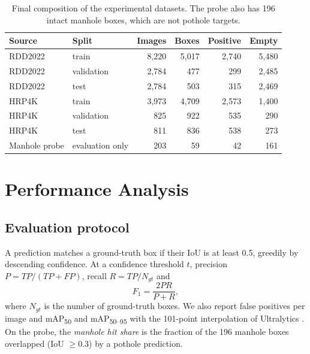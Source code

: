 \begin{table}[!htbp]
\centering
\small
\renewcommand{\arraystretch}{1.2}
\begin{tabular}{|L{2.8cm}|L{2.6cm}|r|r|r|r|}
\hline
\textbf{Source} & \textbf{Split} & \textbf{Images} & \textbf{Boxes} & \textbf{Positive} & \textbf{Empty} \\
\hline
RDD2022 & train & 8,220 & 5,017 & 2,740 & 5,480 \\
\hline
RDD2022 & validation & 2,784 & 477 & 299 & 2,485 \\
\hline
RDD2022 & test & 2,784 & 503 & 315 & 2,469 \\
\hline
HRP4K & train & 3,973 & 4,709 & 2,573 & 1,400 \\
\hline
HRP4K & validation & 825 & 922 & 535 & 290 \\
\hline
HRP4K & test & 811 & 836 & 538 & 273 \\
\hline
Manhole probe & evaluation only & 203 & 59 & 42 & 161 \\
\hline
\end{tabular}
\caption{Final composition of the experimental datasets. The probe also has 196 intact manhole boxes, which are not pothole targets.}
\label{tab:ch6-composition}
\end{table}

\section{Performance Analysis}

\subsection{Evaluation protocol}\label{sec:ch6-protocol}
A prediction matches a ground-truth box if their IoU is at least 0.5, greedily by descending confidence. At a confidence threshold $t$, precision $P=TP/(TP+FP)$, recall $R=TP/N_{gt}$ and
\begin{equation}
F_1=\frac{2PR}{P+R},
\label{eq:ch6-f1}
\end{equation}
where $N_{gt}$ is the number of ground-truth boxes. We also report false positives per image and mAP\textsubscript{50} and mAP\textsubscript{50--95} with the 101-point interpolation of Ultralytics \cite{padilla2020survey}. On the probe, the \emph{manhole hit share} is the fraction of the 196 manhole boxes overlapped (IoU $\ge 0.3$) by a pothole prediction.


